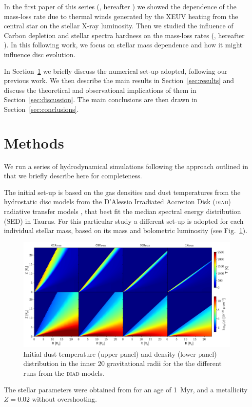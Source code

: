 \documentclass[usenatbib,useAMS,usedcolumn]{mnras}
\begin{document}
In the first paper of this series (, hereafter ) we showed the dependence of the mass-loss rate due to thermal winds generated by the XEUV heating from the central star on the stellar X-ray luminosity. Then we studied the influence of Carbon depletion  and stellar spectra hardness on the mass-loss rates (, hereafter ). In this following work, we focus on stellar mass dependence and how it might influence disc evolution.

In Section~\ref{sec:methods} we briefly discuss the numerical set-up adopted, following our previous work. We then describe the main results in Section~\ref{sec:results} and discuss the theoretical and observational implications of them in Section~\ref{sec:discussion}. The main conclusions are then drawn in Section~\ref{sec:conclusions}.

\section{Methods}\label{sec:methods}
We run a series of hydrodynamical simulations following the approach outlined in  that we briefly describe here for completeness.

The initial set-up is based on the gas densities and dust temperatures from the hydrostatic disc models from the D’Alessio Irradiated Accretion Disk (\textsc{diad}) radiative transfer models , that best fit the median spectral energy distribution (SED) in Taurus. 
For this particular study a different set-up is adopted for each individual stellar mass, based on its mass and bolometric luminosity (see Fig.~\ref{fig:initdiscs}).
\begin{figure}
    \centering
    \includegraphics[width=\textwidth]{Figure1}
    \caption{Initial dust temperature (upper panel) and density (lower panel) distribution in the inner 20 gravitational radii for the the different runs from the \textsc{diad} models. \label{fig:initdiscs}}
\end{figure}
The stellar parameters were obtained from  for an age of \SI{1}{Myr}, and a metallicity $Z=0.02$ without overshooting.
\end{document}

